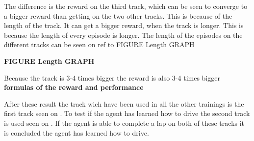 The difference is the reward on the third track, which can be seen to converge to a bigger reward than getting on the two other tracks. This is because of the length of the track. It can get a bigger reward, when the track is longer. This is because the length of every episode is longer. The length of the episodes on the different tracks can be seen on {ref to FIGURE Length GRAPH}      

\textbf{FIGURE Length GRAPH}

Because the track is 3-4 times bigger the reward is also 3-4 times bigger \textbf{formulas of the reward and performance}

After these result the track wich have been used in all the other trainings is the first track seen on . To test if the agent has learned how to drive the second track is used seen on . If the agent is able to complete a lap on both of these tracks it is concluded the agent has learned how to drive.   



